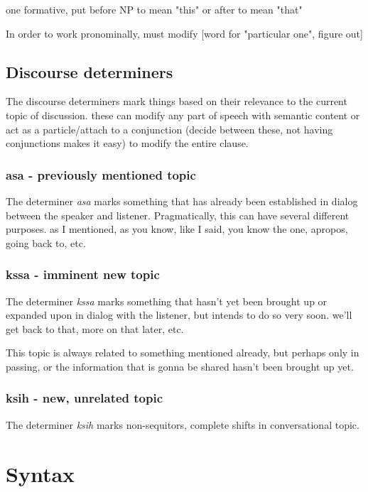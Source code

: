 \documentclass[smallroyalvopaper,9pt]{memoir} %
\begin{document}
one formative, put before NP to mean "this" or after to mean "that"

In order to work pronominally, must modify [word for "particular one", figure out]

\section{Discourse determiners}

The discourse determiners mark things based on their relevance to the current topic of discussion. these can modify any part of speech with semantic content or act as a particle/attach to a conjunction (decide between these, not having conjunctions makes it easy) to modify the entire clause.

\subsection{asa - previously mentioned topic}

The determiner \textit{asa} marks something that has already been established in dialog between the speaker and listener. Pragmatically, this can have several different purposes. as I mentioned, as you know, like I said, you know the one, apropos, going back to, etc.

\subsection{kssa - imminent new topic}

The determiner \textit{kssa} marks something that hasn't yet been brought up or expanded upon in dialog with the listener, but intends to do so very soon. we'll get back to that, more on that later, etc.

This topic is always related to something mentioned already, but perhaps only in passing, or the information that is gonna be shared hasn't been brought up yet.

\subsection{ksih - new, unrelated topic}

The determiner \textit{ksih} marks non-sequitors, complete shifts in conversational topic. 

\chapter{Syntax}
\end{document}
